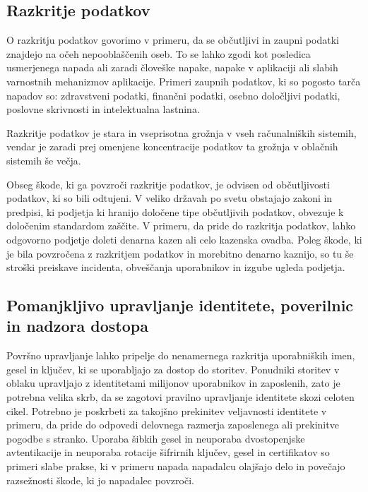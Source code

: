 \documentclass[12pt,a4paper,openany,tikz]{book}
\theoremstyle{plain}
\theoremstyle{definition}
\begin{document}
\subsection{Razkritje podatkov}
\label{sub:Razkritje podatkov}

O razkritju podatkov govorimo v primeru, da se občutljivi in zaupni podatki znajdejo na očeh nepooblaščenih oseb.  To se lahko zgodi kot posledica usmerjenega napada ali zaradi človeške napake, napake v aplikaciji ali slabih varnostnih mehanizmov aplikacije. Primeri zaupnih podatkov, ki so pogosto tarča napadov so: zdravstveni podatki, finančni podatki, osebno določljivi podatki, poslovne skrivnosti in intelektualna lastnina.

Razkritje podatkov je stara in vseprisotna grožnja v vseh računalniških sistemih, vendar je zaradi prej omenjene koncentracije podatkov ta grožnja v oblačnih sistemih še večja.

Obseg škode, ki ga povzroči razkritje podatkov, je odvisen od občutljivosti podatkov, ki so bili odtujeni. V veliko državah po svetu obstajajo zakoni in predpisi, ki podjetja ki hranijo določene tipe občutljivih podatkov, obvezuje k določenim standardom zaščite. V primeru, da pride do razkritja podatkov, lahko odgovorno podjetje doleti denarna kazen ali celo kazenska ovadba. Poleg škode, ki je bila povzročena z razkritjem podatkov in morebitno denarno kaznijo, so tu še stroški preiskave incidenta, obveščanja uporabnikov in izgube ugleda podjetja.

\subsection{Pomanjkljivo upravljanje identitete, poverilnic in nadzora dostopa}
\label{sub:Pomanjkljivo upravljanje identitete, poverilnic in nadzora dostopa}

Površno upravljanje lahko pripelje do nenamernega razkritja uporabniških imen, gesel in ključev, ki se uporabljajo za dostop do storitev. Ponudniki storitev v oblaku upravljajo z identitetami milijonov uporabnikov in zaposlenih, zato je potrebna velika skrb, da se zagotovi pravilno upravljanje identitete skozi celoten cikel. Potrebno je poskrbeti za takojšno prekinitev veljavnosti identitete v primeru, da pride do odpovedi delovnega razmerja zaposlenega ali prekinitve pogodbe s stranko. Uporaba šibkih gesel in neuporaba dvostopenjske avtentikacije in neuporaba rotacije šifrirnih ključev, gesel in certifikatov so primeri slabe prakse, ki v primeru napada napadalcu olajšajo delo in povečajo razsežnosti škode, ki jo napadalec povzroči.
\end{document}
